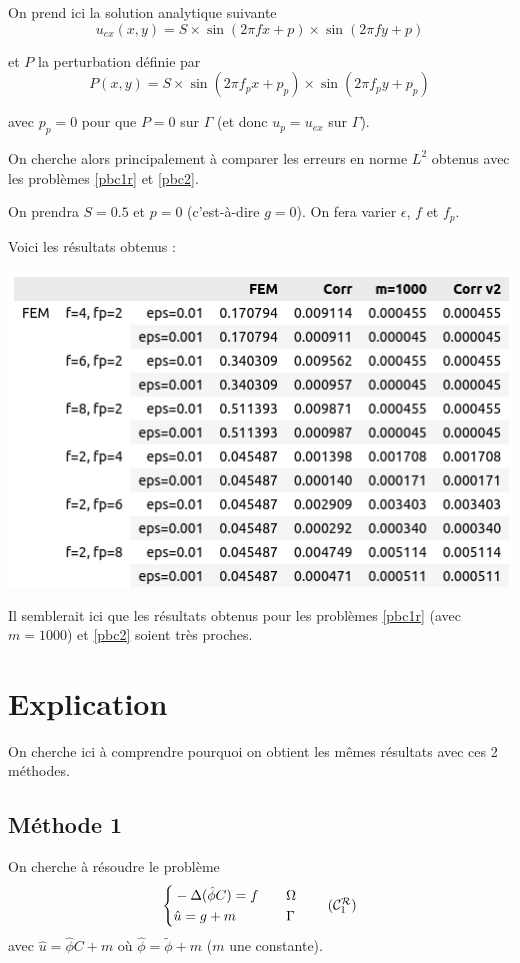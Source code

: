 \documentclass[french]{article}
\begin{document}
	On prend ici la solution analytique suivante
	$$u_{ex}(x,y) = S\times\sin(2\pi fx + p)\times\sin(2\pi fy + p)$$ 
	
	et $P$ la perturbation définie par
	$$P(x,y)=S\times\sin(2\pi f_px + p_p)\times\sin(2\pi f_py + p_p)$$
	
	avec $p_p=0$ pour que $P=0$ sur $\Gamma$ (et donc $u_p=u_{ex}$ sur $\Gamma$). 
	
	On cherche alors principalement à comparer les erreurs en norme $L^2$ obtenus avec les problèmes \ref{pbc1r} et \ref{pbc2}.
	
	On prendra $S=0.5$ et $p=0$ (c'est-à-dire $g=0$). On fera varier $\epsilon$, $f$ et $f_p$. 
	
	\newpage
	
	Voici les résultats obtenus :
	
	\begin{minipage}{\linewidth}
		\centering
		\includegraphics[width=0.6\linewidth]{resultats.png}
	\end{minipage}

	Il semblerait ici que les résultats obtenus pour les problèmes \ref{pbc1r} (avec $m=1000$) et \ref{pbc2} soient très proches.

	\section*{Explication}
	
	On cherche ici à comprendre pourquoi on obtient les mêmes résultats avec ces 2 méthodes.
	
	\subsection*{Méthode 1}
	
	On cherche à résoudre le problème
	\begin{equation}
		\left\{\begin{aligned}
			&-\Delta (\hat{\phi}C)=f \quad &&\Omega \\
			&\hat{u}=g+m \quad &&\Gamma
		\end{aligned}\right. \tag{$\mathcal{C}_1^\mathcal{R}$}
	\end{equation}
	avec $\hat{u}=\hat{\phi}C+m$ où $\hat{\phi}=\tilde{\phi}+m$ ($m$ une constante).
	
\end{document}
